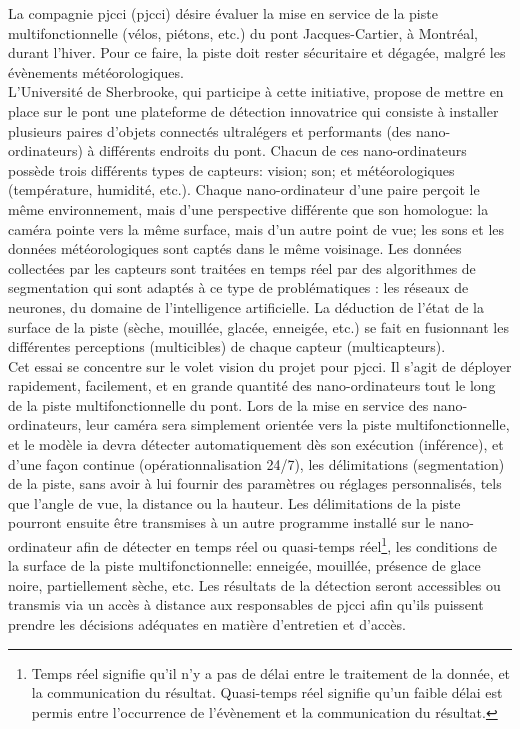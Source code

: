 ﻿\noindent La compagnie \acrlong{pjcci} (\acrshort{pjcci}) désire évaluer la mise en service de la piste multifonctionnelle (vélos, piétons, etc.) du pont Jacques-Cartier, à Montréal, durant l'hiver. Pour ce faire, la piste doit rester sécuritaire et dégagée, malgré les évènements météorologiques.
\vspace{\baselineskip}
\\
\noindent L'Université de Sherbrooke, qui participe à cette initiative, propose de mettre en place sur le pont une plateforme de détection innovatrice qui consiste à installer plusieurs paires d'objets connectés ultralégers et performants (des nano-ordinateurs) à différents endroits du pont. Chacun de ces nano-ordinateurs possède trois différents types de capteurs: vision; son; et météorologiques (température, humidité, etc.). Chaque nano-ordinateur d'une paire perçoit le même environnement, mais d'une perspective différente que son homologue: la caméra pointe vers la même surface, mais d'un autre point de vue; les sons et les données météorologiques sont captés dans le même voisinage. Les données collectées par les capteurs sont traitées en temps réel par des algorithmes de segmentation qui sont adaptés à ce type de problématiques : les réseaux de neurones, du domaine de l'intelligence artificielle. La déduction de l'état de la surface de la piste (sèche, mouillée, glacée, enneigée, etc.) se fait en fusionnant les différentes perceptions (multicibles) de chaque capteur (multicapteurs).
\vspace{\baselineskip}
\\
\noindent Cet essai se concentre sur le volet vision du projet pour \acrshort{pjcci}. Il s'agit de déployer rapidement, facilement, et en grande quantité  des nano-ordinateurs tout le long de la piste multifonctionnelle du pont. Lors de la mise en service des nano-ordinateurs, leur caméra sera simplement orientée vers la piste multifonctionnelle, et le modèle \acrshort{ia} devra détecter automatiquement dès son exécution (inférence), et d'une façon continue (opérationnalisation 24/7), les délimitations (segmentation) de la piste, sans avoir à lui fournir des paramètres ou réglages personnalisés, tels que l'angle de vue, la distance ou la hauteur. Les délimitations de la piste pourront ensuite être transmises à un autre programme installé sur le nano-ordinateur afin de détecter en temps réel ou quasi-temps réel\footnote{Temps réel signifie qu'il n'y a pas de délai entre le traitement de la donnée, et la communication du résultat. Quasi-temps réel signifie qu'un faible délai est permis entre l'occurrence de l'évènement et la communication du résultat.}, les conditions de la surface de la piste multifonctionnelle: enneigée, mouillée, présence de glace noire, partiellement sèche, etc. Les résultats de la détection seront accessibles ou transmis via un accès à distance aux responsables de \acrshort{pjcci} afin qu'ils puissent prendre les décisions adéquates en matière d'entretien et d'accès. 
